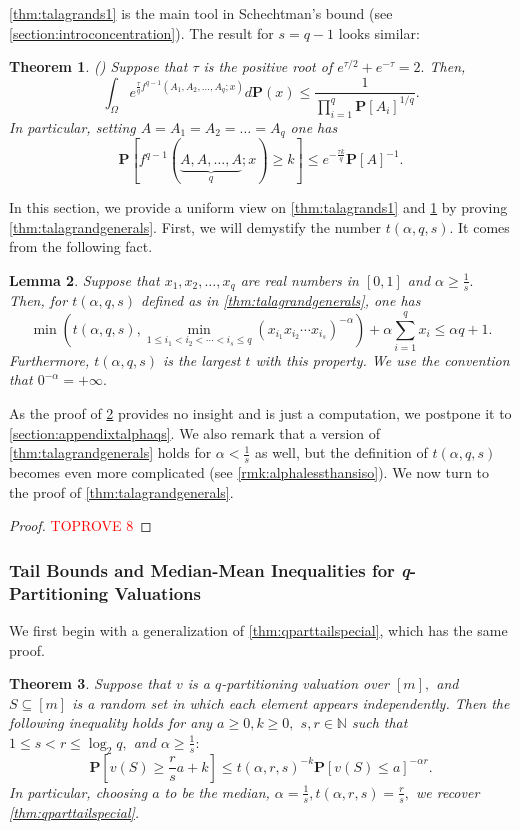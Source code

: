 \documentclass[11pt]{article}%
\newtheorem{theorem}{Theorem}
\newtheorem{lemma}[theorem]{Lemma}
\numberwithin{theorem}{subsection}
\newcommand{\prob}{\mathbf{P}}
\def\hmath$#1${\texorpdfstring{{\rmfamily\textit{#1}}}{#1}}
\begin{document}
\noindent
\cref{thm:talagrands1} is the main tool in Schechtman's bound (see \cref{section:introconcentration}).
The result for $s = q-1$ looks similar:

\begin{theorem}
\label{thm:talagrandsq1}
(\cite[Theorem 5.4]{Talagrand96}) Suppose that $\tau$ is the positive root of $e^{\tau/2} +e^{-\tau} = 2.$ Then,
$$
\int_{\Omega}
e^{\frac{\tau}{q}f^{q-1}(A_1, A_2, \ldots, A_q; x)}d\prob(x)\le 
\frac{1}{\prod_{i=1}^q \prob[A_i]^{1/q}}.
$$
In particular, setting $A= A_1 = A_2= \ldots = A_q$ one has
$$\prob[f^{q-1}(\underbrace{A, A, \ldots, A}_{q}; x)\ge k]\le 
e^{-\frac{\tau k}{q}}\prob[A]^{-1}.$$
\end{theorem}

\noindent
In this section, we provide a uniform view on 
\cref{thm:talagrands1} and \cref{thm:talagrandsq1} by proving \cref{thm:talagrandgenerals}.
First, we will demystify the number $t(\alpha, q, s).$ It comes from the following fact.

\begin{lemma}
\label{lemma:talphaqs}
Suppose that $x_1, x_2, \ldots, x_q$ are real numbers in $[0,1]$ and $\alpha \ge \frac{1}{s}.$ Then, for $t(\alpha,q,s)$ defined as in \cref{thm:talagrandgenerals}, one has
$$
\min \left(
t(\alpha, q, s),
\min_{1\le i_1<i_2<\cdots <i_s\le q}
(x_{i_1}x_{i_2}\cdots x_{i_s})^{-\alpha}
\right)
+ \alpha \sum_{i = 1}^q x_i \le 
\alpha q + 1.
$$
Furthermore, $t(\alpha,q,s)$ is the largest $t$ with this property. We use the convention that $0^{-\alpha}  = +\infty.$
\end{lemma}

\noindent
As the proof of \cref{lemma:talphaqs} provides no insight and is just a computation, we postpone it to \cref{section:appendixtalphaqs}.
We also remark that a version of \cref{thm:talagrandgenerals} holds for $\alpha <\frac{1}{s}$ as well, but the definition of $t(\alpha,q,s)$ becomes even more complicated (see \cref{rmk:alphalessthansiso}).
We now turn to the proof of \cref{thm:talagrandgenerals}.

\begin{proof}\textcolor{red}{TOPROVE 8}\end{proof}


\subsubsection{Tail Bounds and Median-Mean Inequalities for \hmath$q$-Partitioning Valuations}
We first begin with a generalization of \cref{thm:qparttailspecial}, which has the same proof. 
\begin{theorem}
\label{thm:qparttail}
Suppose that $v$ is a $q$-partitioning valuation over $[m],$ and $S\subseteq [m]$ is a random set in which each element appears independently. Then the following inequality holds for any $ a \ge 0, k\ge 0,$ $s,r\in \mathbb{N}$ such that $1\le s < r\le \log_2 q,$ and $\alpha \ge \frac{1}{s}:$  
    $$
    \prob[v(S)\ge \frac{r}{s}a+k]\le 
    t(\alpha, r, s)^{-k}\prob[v(S)\le a]^{-\alpha r}.
    $$
    In particular, choosing $a$ to be the median, $\alpha = \frac{1}{s}, t(\alpha, r, s) = \frac{r}{s},$ we recover \cref{thm:qparttailspecial}.
\end{theorem}
\end{document}
